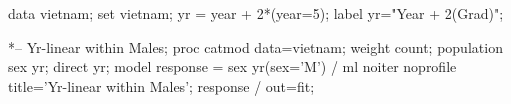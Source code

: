 \begin{listing}

data vietnam;
   set vietnam;
   yr = year + 2*(year=5);
   label yr="Year + 2(Grad)";

*-- Yr-linear within Males;
proc catmod data=vietnam;
   weight count;
   population sex yr;
   direct yr;
   model response = sex yr(sex='M')
       / ml noiter noprofile title='Yr-linear within Males';
   response / out=fit;
\end{listing}
